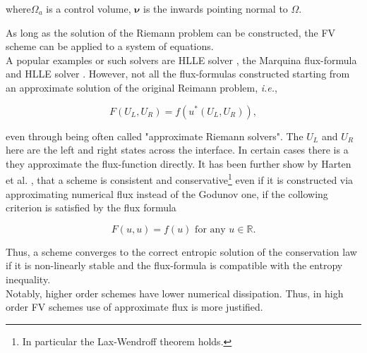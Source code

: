 \documentclass[11pt,a4paper,headinclude=true,DIV=14,BCOR=8mm,chapterprefix,listof=totoc,twoside,openright,abstracton]{scrbook}
\begin{document}
where$\Omega_a$ is a control volume, $\boldsymbol{\nu}$ is the inwards pointing normal to $\Omega$.

As long as the solution of the Riemann problem can be constructed, the FV scheme can be applied to a system of equations. \\

A popular examples or such solvers are HLLE solver \cite{Roe:1981}, the Marquina flux-formula \cite{Donat:1996} and HLLE solver \cite{Einfeldt:1988}. However, not all the flux-formulas constructed starting from an approximate solution of the original Reimann problem, \textit{i.e.},

\begin{equation}
    F(U_L, U_R) = f(u^*(U_L, U_R)), 
\end{equation}

even through being often called "approximate Riemann solvers". The $U_L$ and $U_R$ here are the left and right states across the interface. In certain cases there is a they approximate the flux-function directly. It has been further show by Harten et al. \cite{Harten:1983}, that a scheme is consistent and conservative\footnote{In particular the Lax-Wendroff theorem holds.} even if it is constructed via approximating numerical flux instead of the Godunov one, if the collowing criterion is satisfied by the flux formula

\begin{equation}
    F(u, u) = f(u) \text{ for any } u\in \mathbb{R}.
\end{equation}

Thus, a scheme converges to the correct entropic solution of the conservation law if it is non-linearly stable and the flux-formula is compatible with the entropy inequality. \\

Notably, higher order schemes have lower numerical dissipation. Thus, in high order FV schemes use of approximate flux is more justified.
\end{document}

